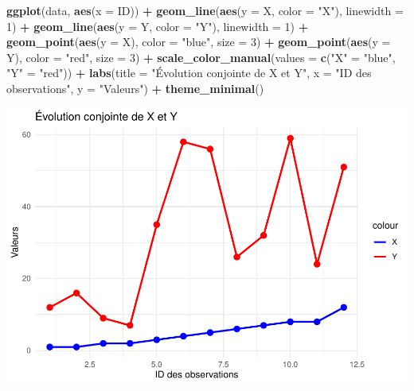 \documentclass[
  12pt,
]{article}
\newenvironment{Shaded}{\begin{snugshade}}{\end{snugshade}}
\newcommand{\AttributeTok}[1]{\textcolor[rgb]{0.13,0.29,0.53}{#1}}
\newcommand{\DecValTok}[1]{\textcolor[rgb]{0.00,0.00,0.81}{#1}}
\newcommand{\FunctionTok}[1]{\textcolor[rgb]{0.13,0.29,0.53}{\textbf{#1}}}
\newcommand{\NormalTok}[1]{#1}
\newcommand{\OtherTok}[1]{\textcolor[rgb]{0.56,0.35,0.01}{#1}}
\newcommand{\SpecialCharTok}[1]{\textcolor[rgb]{0.81,0.36,0.00}{\textbf{#1}}}
\newcommand{\StringTok}[1]{\textcolor[rgb]{0.31,0.60,0.02}{#1}}
\begin{document}
\begin{Shaded}
\begin{Highlighting}[]
\FunctionTok{ggplot}\NormalTok{(data, }\FunctionTok{aes}\NormalTok{(}\AttributeTok{x =}\NormalTok{ ID)) }\SpecialCharTok{+}
  \FunctionTok{geom\_line}\NormalTok{(}\FunctionTok{aes}\NormalTok{(}\AttributeTok{y =}\NormalTok{ X, }\AttributeTok{color =} \StringTok{"X"}\NormalTok{), }\AttributeTok{linewidth =} \DecValTok{1}\NormalTok{) }\SpecialCharTok{+}
  \FunctionTok{geom\_line}\NormalTok{(}\FunctionTok{aes}\NormalTok{(}\AttributeTok{y =}\NormalTok{ Y, }\AttributeTok{color =} \StringTok{"Y"}\NormalTok{), }\AttributeTok{linewidth =} \DecValTok{1}\NormalTok{) }\SpecialCharTok{+}
  \FunctionTok{geom\_point}\NormalTok{(}\FunctionTok{aes}\NormalTok{(}\AttributeTok{y =}\NormalTok{ X), }\AttributeTok{color =} \StringTok{"blue"}\NormalTok{, }\AttributeTok{size =} \DecValTok{3}\NormalTok{) }\SpecialCharTok{+}
  \FunctionTok{geom\_point}\NormalTok{(}\FunctionTok{aes}\NormalTok{(}\AttributeTok{y =}\NormalTok{ Y), }\AttributeTok{color =} \StringTok{"red"}\NormalTok{, }\AttributeTok{size =} \DecValTok{3}\NormalTok{) }\SpecialCharTok{+}
  \FunctionTok{scale\_color\_manual}\NormalTok{(}\AttributeTok{values =} \FunctionTok{c}\NormalTok{(}\StringTok{"X"} \OtherTok{=} \StringTok{"blue"}\NormalTok{, }\StringTok{"Y"} \OtherTok{=} \StringTok{"red"}\NormalTok{)) }\SpecialCharTok{+}
  \FunctionTok{labs}\NormalTok{(}\AttributeTok{title =} \StringTok{"Évolution conjointe de X et Y"}\NormalTok{,}
       \AttributeTok{x =} \StringTok{"ID des observations"}\NormalTok{,}
       \AttributeTok{y =} \StringTok{"Valeurs"}\NormalTok{) }\SpecialCharTok{+}
  \FunctionTok{theme\_minimal}\NormalTok{()}
\end{Highlighting}
\end{Shaded}

\includegraphics{Stat_non_para_files/figure-latex/unnamed-chunk-59-1.pdf}
\end{document}
